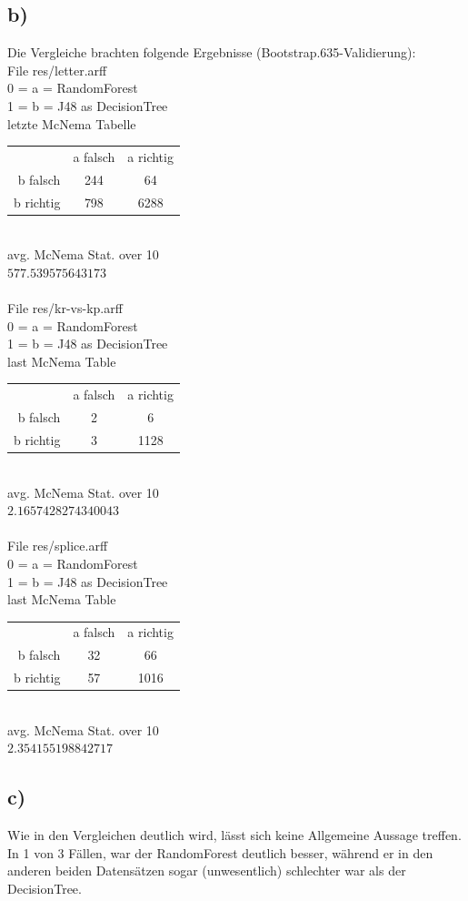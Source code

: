\documentclass[a4paper,11pt,twoside]{article}
\begin{document}
\subsection*{b)}
Die Vergleiche brachten folgende Ergebnisse (Bootstrap.635-Validierung):\\
File res/letter.arff\\
0 = a = RandomForest\\
1 = b = J48 as DecisionTree\\
letzte McNema Tabelle\\
\begin{tabular}{rcc}
 &a falsch&a richtig\\
b falsch&244&64\\
b richtig&798&6288
\end{tabular}\\
avg. McNema Stat. over 10\\
$577.539575643173$\\
$~$\\
File res/kr-vs-kp.arff\\
0 = a = RandomForest\\
1 = b = J48 as DecisionTree\\
last McNema Table\\
\begin{tabular}{rcc}
	&a falsch&a richtig\\
	b falsch&2&6\\
	b richtig&3&1128
\end{tabular}\\
avg. McNema Stat. over 10\\
$2.1657428274340043$\\
$~$\\
File res/splice.arff\\
0 = a = RandomForest\\
1 = b = J48 as DecisionTree\\
last McNema Table\\
\begin{tabular}{rcc}
	&a falsch&a richtig\\
	b falsch&32&66\\
	b richtig&57&1016
\end{tabular}\\
avg. McNema Stat. over 10\\
$2.354155198842717$\\
\subsection*{c)}
Wie in den Vergleichen deutlich wird, lässt sich keine Allgemeine Aussage treffen. In 1 von 3 Fällen, war der RandomForest deutlich besser, während er in den anderen beiden Datensätzen sogar (unwesentlich) schlechter war als der DecisionTree.
\end{document}
